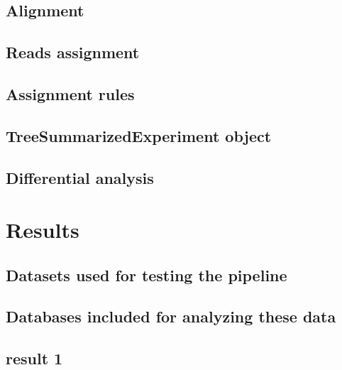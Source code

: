 \documentclass[12pt,twoside]{reedthesis}
\begin{document}
\hypertarget{alignment}{%
\subsection{Alignment}\label{alignment}}

\hypertarget{reads-assignment}{%
\subsection{Reads assignment}\label{reads-assignment}}

\hypertarget{assignment-rules}{%
\subsection{Assignment rules}\label{assignment-rules}}

\hypertarget{treesummarizedexperiment-object}{%
\subsection{TreeSummarizedExperiment object}\label{treesummarizedexperiment-object}}

\hypertarget{differential-analysis}{%
\subsection{Differential analysis}\label{differential-analysis}}

\hypertarget{results-2}{%
\section{Results}\label{results-2}}

\hypertarget{datasets-used-for-testing-the-pipeline}{%
\subsection{Datasets used for testing the pipeline}\label{datasets-used-for-testing-the-pipeline}}

\hypertarget{databases-included-for-analyzing-these-data}{%
\subsection{Databases included for analyzing these data}\label{databases-included-for-analyzing-these-data}}

\hypertarget{result-1}{%
\subsection{result 1}\label{result-1}}
\end{document}

